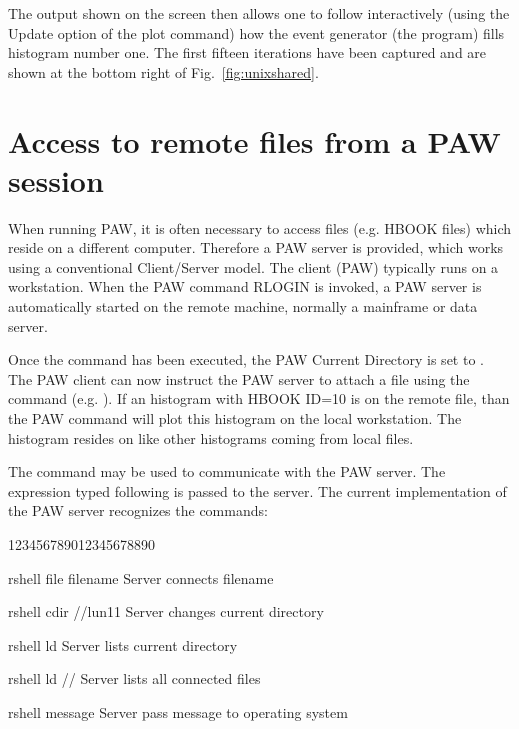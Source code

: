 The output shown on the screen then allows one to follow interactively 
(using the Update option  of the plot command) how the
event generator (the  program) fills histogram number one.
The first fifteen iterations have been captured and are
shown at the bottom right of Fig.~\ref{fig:unixshared}.

\newpage

\section{Access to remote files from a PAW session}
 
When running PAW, it is often necessary to access files
(e.g. HBOOK files) which reside on a different computer. 
Therefore a PAW server is provided, which works using
a conventional Client/Server model. 
The client
(PAW) typically runs on a workstation. When the PAW command RLOGIN is invoked,
a PAW server is automatically started on the remote machine, normally
a mainframe or data server. 
 
Once the  command has been executed, the PAW Current Directory
is set to . The PAW client can now instruct the PAW server to
attach a file using the  command (e.g. ). If an
histogram with HBOOK ID=10 is on the remote file, than the PAW command
will plot this histogram on the local workstation. The histogram resides
on  like other histograms coming from local files.
 
The  command may be used to communicate with the PAW server.
The expression typed following  is passed to the server. The current
implementation of the PAW server recognizes the commands:
\begin{DLtt}{123456789012345678890}
\item[rshell file filename]Server connects filename
\item[rshell cdir //lun11] Server changes current directory
\item[rshell ld]           Server lists current directory
\item[rshell ld //]        Server lists all connected files
\item[rshell message]      Server pass message to operating system
\end{DLtt}
 
